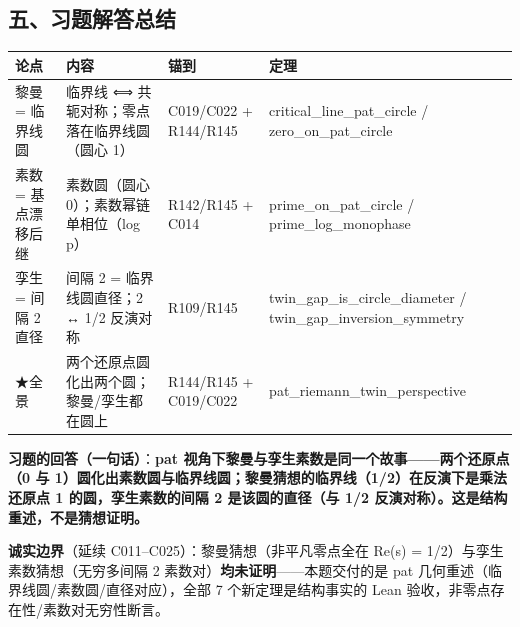 \documentclass[
]{article}
\newcounter{none} %
\begin{document}
\subsection{五、习题解答总结}\label{ux4e94ux4e60ux9898ux89e3ux7b54ux603bux7ed3}

{\def\LTcaptype{none} %
\begin{longtable}[]{@{}
 >{\raggedright\arraybackslash}p{}
 >{\raggedright\arraybackslash}p{}
 >{\raggedright\arraybackslash}p{}
 >{\raggedright\arraybackslash}p{}@{}}
\toprule\noalign{}
\begin{minipage}[b]{\linewidth}\raggedright
论点
\end{minipage} & \begin{minipage}[b]{\linewidth}\raggedright
内容
\end{minipage} & \begin{minipage}[b]{\linewidth}\raggedright
锚到
\end{minipage} & \begin{minipage}[b]{\linewidth}\raggedright
定理
\end{minipage} \\
\midrule\noalign{}
\endhead
\bottomrule\noalign{}
\endlastfoot
黎曼 = 临界线圆 & 临界线 ⟺ 共轭对称；零点落在临界线圆（圆心 1） &
C019/C022 + R144/R145 & critical\_line\_pat\_circle /
zero\_on\_pat\_circle \\
素数 = 基点漂移后继 & 素数圆（圆心 0）；素数幂链单相位（log p） &
R142/R145 + C014 & prime\_on\_pat\_circle / prime\_log\_monophase \\
孪生 = 间隔 2 直径 & 间隔 2 = 临界线圆直径；2 ↔ 1/2 反演对称 & R109/R145
& twin\_gap\_is\_circle\_diameter / twin\_gap\_inversion\_symmetry \\
★全景 & 两个还原点圆化出两个圆；黎曼/孪生都在圆上 & R144/R145 +
C019/C022 & pat\_riemann\_twin\_perspective \\
\end{longtable}
}

\textbf{习题的回答（一句话）}：\textbf{pat
视角下黎曼与孪生素数是同一个故事------两个还原点（0 与
1）圆化出素数圆与临界线圆；黎曼猜想的临界线（1/2）在反演下是乘法还原点 1
的圆，孪生素数的间隔 2 是该圆的直径（与 1/2
反演对称）。这是结构重述，不是猜想证明。}

\textbf{诚实边界}（延续 C011--C025）：黎曼猜想（非平凡零点全在 Re(s) =
1/2）与孪生素数猜想（无穷多间隔 2
素数对）\textbf{均未证明}------本题交付的是 pat
几何重述（临界线圆/素数圆/直径对应），全部 7 个新定理是结构事实的 Lean
验收，非零点存在性/素数对无穷性断言。
\end{document}
